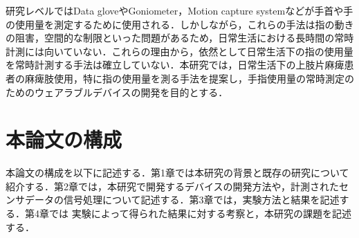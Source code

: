 研究レベルではData gloveやGoniometer，Motion capture system\cite{Binh2014,Valtin2017,Chen2003,Ren2011}などが手首や手の使用量を測定するために使用される．しかしながら，これらの手法は指の動きの阻害，空間的な制限といった問題があるため，日常生活における長時間の常時計測には向いていない．これらの理由から，依然として日常生活下の指の使用量を常時計測する手法は確立していない．本研究では，日常生活下の上肢片麻痺患者の麻痺肢使用，特に指の使用量を測る手法を提案し，手指使用量の常時測定のためのウェアラブルデバイスの開発を目的とする．


\section{本論文の構成}
本論文の構成を以下に記述する．第1章では本研究の背景と既存の研究について紹介する．第2章では，本研究で開発するデバイスの開発方法や，計測されたセンサデータの信号処理について記述する．第3章では，実験方法と結果を記述する．第4章では
実験によって得られた結果に対する考察と，本研究の課題を記述する．